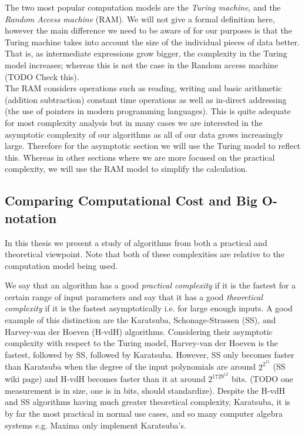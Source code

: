 The two most popular computation models are the \textit{Turing machine}, and the \textit{Random Access machine} (RAM). We will not give a formal definition here, however the main difference we need to be aware of for our purposes is that the Turing machine takes into account the size of the individual pieces of data better. That is, as intermediate expressions grow bigger, the complexity in the Turing model increases; whereas this is not the case in the Random access machine (TODO Check this).\\
The RAM considers operations such as reading, writing and basic arithmetic (addition subtraction) constant time operations as well as in-direct addressing (the use of pointers in modern programming languages). This is quite adequate for most complexity analysis but in many cases we are interested in the asymptotic complexity of our algorithms as all of our data grows increasingly large. Therefore for the asymptotic section we will use the Turing model to reflect this. Whereas in other sections where we are more focused on the practical complexity, we will use the RAM model to simplify the calculation.

\subsection{Comparing Computational Cost and Big O-notation}%
\label{sub:Comparing Computational Cost and Big O-notation}

In this thesis we present a study of algorithms from both a practical and theoretical viewpoint. Note that both of these complexities are relative to the computation model being used.

We say that an algorithm has a good \textit{practical complexity} if it is the fastest for a certain range of input parameters and say that it has a good \textit{theoretical complexity} if it is the fastest asymptotically i.e. for large enough inputs. A good example of this distinction are the Karatsuba, Schonage-Strassen (SS), and Harvey-van der Hoeven (H-vdH) algorithms. Considering their asymptotic complexity with respect to the Turing model, Harvey-van der Hoeven is the fastest, followed by SS, followed by Karatsuba. However, SS only becomes faster than Karatsuba when the degree of the input polynomials are around $2^{2^{15}}$ (SS wiki page) and H-vdH becomes faster than it at around $2^{1729^{12}}$ bits. (TODO one measurement is in size, one is in bits, should standardize). Despite the H-vdH and SS algorithms having much greater theoretical complexity, Karatsuba, it is by far the most practical in normal use cases, and so many computer algebra systems e.g. Maxima only implement Karatsuba's.

